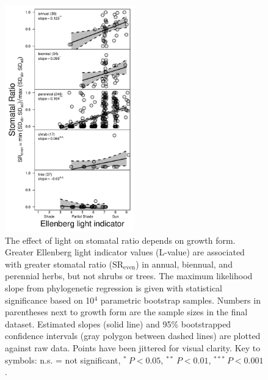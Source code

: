 \documentclass[12pt, oneside]{article}
\newcommand{\el}{L-value}
\begin{document}
\begin{figure}[ht]
\centerline{\includegraphics[width=0.5\textwidth]{figures/figure_SR-hf.pdf}}
\caption{The effect of light on stomatal ratio depends on growth form. Greater Ellenberg light indicator values (\el) are associated with greater stomatal ratio ($\mathrm{SR_{even}}$) in annual, biennual, and perennial herbs, but not shrubs or trees. The maximum likelihood slope from phylogenetic regression is given with statistical significance based on 10$^4$ parametric bootstrap samples. Numbers in parentheses next to growth form are the sample sizes in the final dataset. Estimated slopes (solid line) and 95\% bootstrapped confidence intervals (gray polygon between dashed lines) are plotted against raw data. Points have been jittered for visual clarity. Key to symbols: n.s. = not significant,  $^*~P < 0.05$, $^{**}~P < 0.01$, $^{***}~P < 0.001$.} 
\label{fig:SR-hf}
\end{figure}
\end{document}
